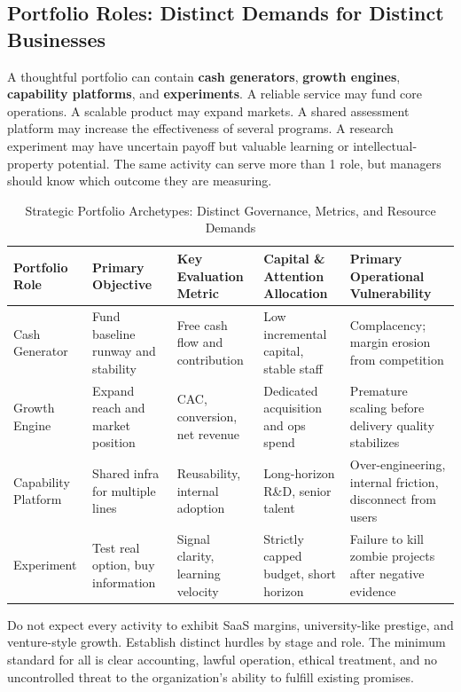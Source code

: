 \subsection{Portfolio Roles: Distinct Demands for Distinct Businesses}
\label{sec:portfolio_roles_distinct_demands}

A thoughtful portfolio can contain \textbf{cash generators}, \textbf{growth engines}, \textbf{capability platforms}, and \textbf{experiments}. A reliable service may fund core operations. A scalable product may expand markets. A shared assessment platform may increase the effectiveness of several programs. A research experiment may have uncertain payoff but valuable learning or intellectual-property potential. The same activity can serve more than 1 role, but managers should know which outcome they are measuring.

\begin{table}[t]
\centering
\small
\caption{Strategic Portfolio Archetypes: Distinct Governance, Metrics, and Resource Demands}
\label{tab:portfolio_archetypes}
\begin{tabularx}{\textwidth}{p{2.8cm} p{2.8cm} p{2.6cm} p{3.2cm} X}
\toprule
\textbf{Portfolio Role} & \textbf{Primary Objective} & \textbf{Key Evaluation Metric} & \textbf{Capital \& Attention Allocation} & \textbf{Primary Operational Vulnerability} \\
\midrule
Cash Generator & Fund baseline runway and stability & Free cash flow and contribution & Low incremental capital, stable staff & Complacency; margin erosion from competition \\
\addlinespace[2pt]
Growth Engine & Expand reach and market position & CAC, conversion, net revenue & Dedicated acquisition and ops spend & Premature scaling before delivery quality stabilizes \\
\addlinespace[2pt]
Capability Platform & Shared infra for multiple lines & Reusability, internal adoption & Long-horizon R\&D, senior talent & Over-engineering, internal friction, disconnect from users \\
\addlinespace[2pt]
Experiment & Test real option, buy information & Signal clarity, learning velocity & Strictly capped budget, short horizon & Failure to kill zombie projects after negative evidence \\
\bottomrule
\end{tabularx}
\end{table}

Do not expect every activity to exhibit SaaS margins, university-like prestige, and venture-style growth. Establish distinct hurdles by stage and role. The minimum standard for all is clear accounting, lawful operation, ethical treatment, and no uncontrolled threat to the organization's ability to fulfill existing promises.


